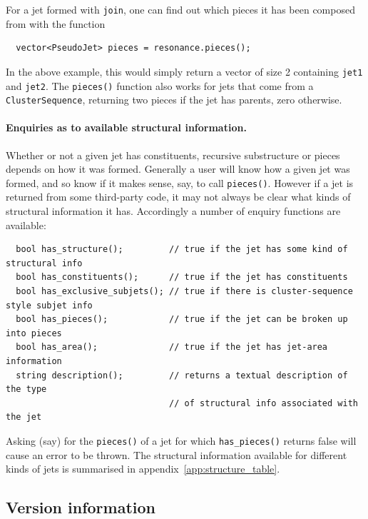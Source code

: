 \documentclass[12pt,a4]{article}
\newcommand{\ttt}[1]{{\small\texttt{#1}}}
\newcommand{\CS}{\ttt{ClusterSequence}\xspace}
\begin{document}
For a jet formed with \ttt{join}, one can find out which pieces it has
been composed from with the function
\begin{lstlisting}
  vector<PseudoJet> pieces = resonance.pieces();
\end{lstlisting}
In the above example, this would simply return a vector of size 2
containing \ttt{jet1} and \ttt{jet2}.
%
The \ttt{pieces()} function also works for jets that come from a \CS,
returning two pieces if the jet has parents, zero otherwise.



\paragraph{Enquiries as to available structural information.}

Whether or not a given jet has constituents, recursive substructure or
pieces depends on how it was formed. 
%
Generally a user will know how a given jet was formed, and so know if
it makes sense, say, to call \ttt{pieces()}.  
%
However if a jet is returned from some third-party code, it may not
always be clear what kinds of structural information it has. 
%
Accordingly a number of enquiry functions are available:
\begin{lstlisting}
  bool has_structure();         // true if the jet has some kind of structural info
  bool has_constituents();      // true if the jet has constituents 
  bool has_exclusive_subjets(); // true if there is cluster-sequence style subjet info
  bool has_pieces();            // true if the jet can be broken up into pieces
  bool has_area();              // true if the jet has jet-area information
  string description();         // returns a textual description of the type
                                // of structural info associated with the jet
\end{lstlisting}
Asking (say) for the \ttt{pieces()} of a jet for which
\ttt{has\_pieces()} returns false will cause an error to be thrown.
%
The structural information available for different kinds of jets is
summarised in appendix~\ref{app:structure_table}.



\subsection{Version information}
\label{sec:version-information}
\end{document}
